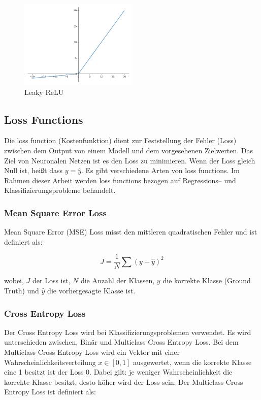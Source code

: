 \begin{figure}[H]
  \centering
  \includegraphics[width=0.5\textwidth]{resources/nn/leaky-relu.png}
  \caption{
    Leaky ReLU 
    \cite{leaky-relu}
  }
  \label{image:leaky-relu}
\end{figure}

\newpage
\subsection{Loss Functions}
Die \gls{loss function} (Kostenfunktion) dient zur Feststellung der Fehler (Loss) zwischen dem Output von einem Modell und dem vorgesehenen Zielwerten. 
Das Ziel von Neuronalen Netzen ist es den Loss zu minimieren. Wenn der Loss gleich Null ist, heißt dass $ y = \hat{y} $. Es gibt verschiedene Arten 
von \gls{loss function}s. Im Rahmen dieser Arbeit werden \gls{loss function}s bezogen auf Regressions– und Klassifizierungsprobleme behandelt.

\subsubsection{Mean Square Error Loss}
Mean Square Error (MSE) Loss misst den mittleren quadratischen Fehler und ist definiert als:

\begin{equation}
  J = \frac{1}{N} \sum (y - \hat{y})^2
\end{equation}

wobei, $J$ der Loss ist, $N$ die Anzahl der Klassen, $y$ die korrekte Klasse (Ground Truth) und $ \hat{y}$ die vorhergesagte Klasse ist.

\subsubsection{Cross Entropy Loss}
Der Cross Entropy Loss wird bei Klassifizierungsproblemen verwendet. Es wird unterschieden zwischen, Binär und Multiclass Cross Entropy Loss. 
Bei dem Multiclass Cross Entropy Loss wird ein Vektor mit einer Wahrscheinlichkeitsverteilung $ x \in [0, 1] $ 
ausgewertet, wenn die korrekte Klasse eine 1 besitzt ist der Loss 0. Dabei gilt: je weniger Wahrscheinlichkeit die korrekte Klasse besitzt, 
desto höher wird der Loss sein. Der Multiclass Cross Entropy Loss ist definiert als: 

